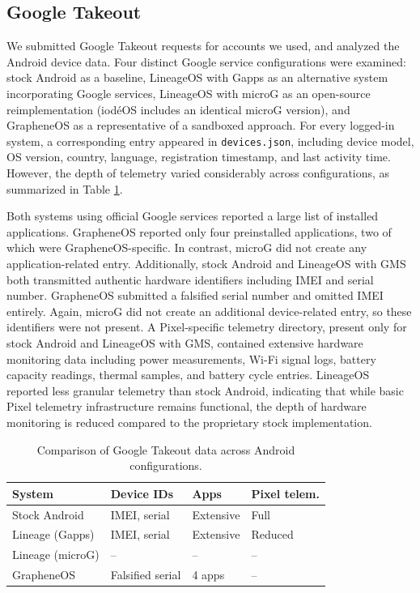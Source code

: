 \subsection{Google Takeout}

We submitted Google Takeout requests for accounts we used, and analyzed the Android device data. Four distinct Google service configurations were examined: stock Android as a baseline, LineageOS with Gapps as an alternative system incorporating Google services, LineageOS with microG as an open-source reimplementation (iod\'eOS includes an identical microG version), and GrapheneOS as a representative of a sandboxed approach. For every logged-in system, a corresponding entry appeared in \texttt{devices.json}, including device model, OS version, country, language, registration timestamp, and last activity time. However, the depth of telemetry varied considerably across configurations, as summarized in Table \ref{tab:takeout-comparison}.

Both systems using official Google services reported a large list of installed applications. GrapheneOS reported only four preinstalled applications, two of which were GrapheneOS-specific. In contrast, microG did not create any application-related entry. Additionally, stock Android and LineageOS with GMS both transmitted authentic hardware identifiers including IMEI and serial number. GrapheneOS submitted a falsified serial number and omitted IMEI entirely. Again, microG did not create an additional device-related entry, so these identifiers were not present. A Pixel-specific telemetry directory, present only for stock Android and LineageOS with GMS, contained extensive hardware monitoring data including power measurements, Wi-Fi signal logs, battery capacity readings, thermal samples, and battery cycle entries. LineageOS reported less granular telemetry than stock Android, indicating that while basic Pixel telemetry infrastructure remains functional, the depth of hardware monitoring is reduced compared to the proprietary stock implementation.

\begin{table}
	\caption{Comparison of Google Takeout data across Android configurations.}
	\label{tab:takeout-comparison}
	\begin{tabular}{llll}
		\toprule
		System & Device IDs & Apps & Pixel telem. \\
		\midrule
		Stock Android & IMEI, serial & Extensive & Full \\
		Lineage (Gapps) & IMEI, serial & Extensive & Reduced \\
		Lineage (microG) & -- & -- & -- \\
		GrapheneOS & Falsified serial & 4 apps & -- \\
		\bottomrule
	\end{tabular}
\end{table}
